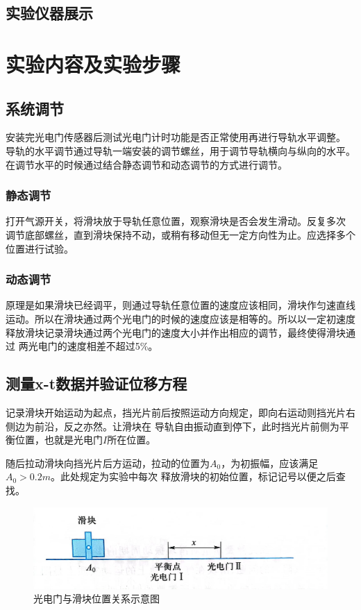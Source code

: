 \documentclass{ctexart}
\begin{document}
  \subsection{实验仪器展示}

\section{实验内容及实验步骤}
  \subsection{系统调节}
  安装完光电门传感器后测试光电门计时功能是否正常使用再进行导轨水平调整。
  导轨的水平调节通过导轨一端安装的调节螺丝，用于调节导轨横向与纵向的水平。
  在调节水平的时候通过结合静态调节和动态调节的方式进行调节。
    \subsubsection{静态调节}
    打开气源开关，将滑块放于导轨任意位置，观察滑块是否会发生滑动。反复多次
    调节底部螺丝，直到滑块保持不动，或稍有移动但无一定方向性为止。应选择多个
    位置进行试验。
    \subsubsection{动态调节}
    原理是如果滑块已经调平，则通过导轨任意位置的速度应该相同，滑块作匀速直线
    运动。所以在滑块通过两个光电门的时候的速度应该是相等的。所以以一定初速度
    释放滑块记录滑块通过两个光电门的速度大小并作出相应的调节，最终使得滑块通过
    两光电门的速度相差不超过5\%。
  \subsection{测量x-t数据并验证位移方程}
  记录滑块开始运动为起点，挡光片前后按照运动方向规定，即向右运动则挡光片右侧边为前沿，反之亦然。让滑块在
  导轨自由振动直到停下，此时挡光片前侧为平衡位置，也就是光电门$I$所在位置。

  随后拉动滑块向挡光片后方运动，拉动的位置为$A_{0}$，为初振幅，应该满足$A_{0}>0.2m$。此处规定为实验中每次
  释放滑块的初始位置，标记记号以便之后查找。
  \begin{figure}[h]
    \centering
    \includegraphics[height=0.3\textwidth,width=1\textwidth]{guangdianmenhuagui.jpg}
    \caption{光电门与滑块位置关系示意图}\label{figureweizhi}
  \end{figure}
\end{document}
